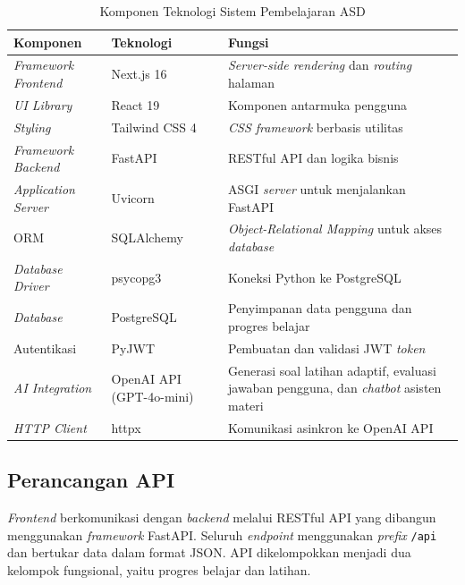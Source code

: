 \begin{table}[H]
    \centering
    \caption{Komponen Teknologi Sistem Pembelajaran ASD}
    \label{tab:tech-stack}
    \begin{tabular}{|L{3cm}|L{3.5cm}|L{6cm}|}
    \hline
    \textbf{Komponen} & \textbf{Teknologi} & \textbf{Fungsi} \\
    \hline
    \textit{Framework Frontend} & Next.js 16 & \textit{Server-side rendering} dan \textit{routing} halaman \\
    \hline
    \textit{UI Library} & React 19 & Komponen antarmuka pengguna \\
    \hline
    \textit{Styling} & Tailwind CSS 4 & \textit{CSS framework} berbasis utilitas \\
    \hline
    \textit{Framework Backend} & FastAPI & RESTful API dan logika bisnis \\
    \hline
    \textit{Application Server} & Uvicorn & ASGI \textit{server} untuk menjalankan FastAPI \\
    \hline
    ORM & SQLAlchemy & \textit{Object-Relational Mapping} untuk akses \textit{database} \\
    \hline
    \textit{Database Driver} & psycopg3 & Koneksi Python ke PostgreSQL \\
    \hline
    \textit{Database} & PostgreSQL & Penyimpanan data pengguna dan progres belajar \\
    \hline
    Autentikasi & PyJWT & Pembuatan dan validasi JWT \textit{token} \\
    \hline
    \textit{AI Integration} & OpenAI API (GPT-4o-mini) & Generasi soal latihan adaptif, evaluasi jawaban pengguna, dan \textit{chatbot} asisten materi \\
    \hline
    \textit{HTTP Client} & httpx & Komunikasi asinkron ke OpenAI API \\
    \hline
    \end{tabular}
\end{table}

\subsection{Perancangan API}

\textit{Frontend} berkomunikasi dengan \textit{backend} melalui RESTful API yang dibangun menggunakan \textit{framework} FastAPI. Seluruh \textit{endpoint} menggunakan \textit{prefix} \texttt{/api} dan bertukar data dalam format JSON. API dikelompokkan menjadi dua kelompok fungsional, yaitu progres belajar dan latihan.

